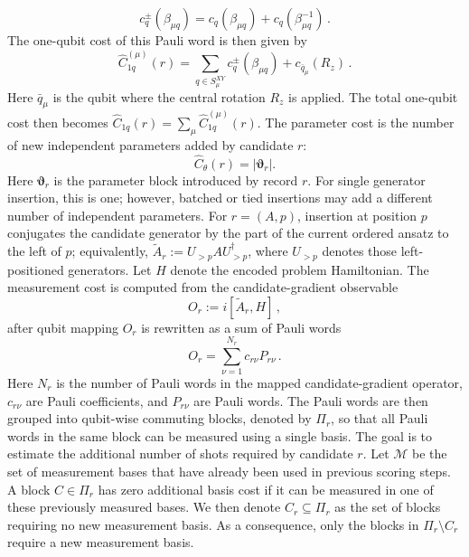 \documentclass[
  reprint,
  amsmath,
  amssymb,
  aps,
  pra,
  nofootinbib,
  superscriptaddress,
  floatfix
]{revtex4-2}
\begin{document}
\[
c_q^{\pm}(\beta_{\mu q})=c_q(\beta_{\mu q})+c_q(\beta^{-1}_{\mu q})\,.
\]
The one-qubit cost of this Pauli word is then given by
%
\begin{equation*}
\widehat{C}_{1q}^{(\mu)}(r) = \sum_{q\in S_{\mu}^{XY}}c_q^\pm(\beta_{\mu q}) + c_{\bar{q}_{\mu}}(R_z)\,.
\end{equation*}
Here \(\bar{q}_{\mu}\) is the qubit where the central rotation \(R_z\) is applied. The total one-qubit cost then becomes \(\widehat{C}_{1q}(r)=\sum_\mu\widehat{C}_{1q}^{(\mu)}(r)\). The parameter cost is the number of new independent parameters added by candidate \(r\):
\begin{equation*}
\widehat C_\theta(r)
=
|\boldsymbol\vartheta_r|.
\end{equation*}
%
Here \(\boldsymbol\vartheta_r\) is the parameter block introduced by record \(r\). For single generator insertion, this is one; however, batched or tied insertions may add a different number of independent parameters. For \(r=(A,p)\), insertion at position \(p\) conjugates the candidate generator by the part of the current ordered ansatz to the left of \(p\); equivalently, \(\widetilde A_r:=U_{>p}AU_{>p}^{\dagger}\), where \(U_{>p}\) denotes those left-positioned generators. Let \(H\) denote the encoded problem Hamiltonian. The measurement cost is computed from the candidate-gradient observable \cite{Verteletskyi2020CliqueCover,Yen2020CompatibleMeasurements}
\[
O_r:=i[\widetilde A_r,H]\,,
\]
after qubit mapping \(O_r\) is rewritten as a sum of Pauli words 
%
\[
O_r=\sum_{\nu=1}^{N_r}c_{r\nu}P_{r\nu}\,.
\]
%
Here \(N_r\) is the number of Pauli words in the mapped candidate-gradient operator, \(c_{r\nu}\) are Pauli coefficients, and \(P_{r\nu}\) are Pauli words.
The Pauli words are then grouped into qubit-wise commuting blocks, denoted by \(\Pi_r\), so that all Pauli words in the same block can be measured using a single basis. The goal is to estimate the additional number of shots required by candidate \(r\). Let \(\mathcal M\) be the set of measurement bases that have already been used in previous scoring steps. A block \(C\in\Pi_r\) has zero additional basis cost if it can be measured in one of these previously measured bases. We then denote \(C_r\subseteq\Pi_r\) as the set of blocks requiring no new measurement basis. As a consequence, only the blocks in \(\Pi_r\setminus C_r\) require a new measurement basis.
\end{document}
